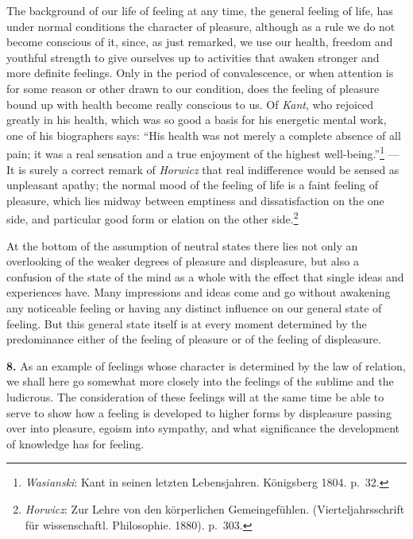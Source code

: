 \documentclass[12pt,a4paper]{book}
\newcommand{\opage}[1]{\marginnote{\footnotesize\textit{[#1]}}}
\begin{document}
The background of our life of feeling at any time, the general feeling
of life, has under normal conditions the character of pleasure, although
as a rule we do not become conscious of it, since, as just remarked, we
use our health, freedom and youthful strength to give ourselves up to
activities that awaken stronger and more definite feelings. Only in the
period of convalescence, or when attention is for some reason or other
drawn to our condition, does the feeling of pleasure bound up with
health become really conscious to us. Of \emph{Kant}, who rejoiced
greatly in his health, which was so good a basis for his energetic
mental work, one of his biographers says: ``His health was not merely a
complete absence of all pain; it was a real sensation and a true
enjoyment of the highest well-being.''\footnote{\emph{Wasianski}: Kant
in seinen letzten Lebensjahren. Königsberg 1804. p.~32.} --- It is
surely a correct remark of \emph{Horwicz} that real indifference would
be sensed as unpleasant apathy; the normal mood of the feeling of life
is a faint feeling of pleasure, which lies midway between emptiness and
dissatisfaction on the one side, and particular good form or elation on
the other
side.\footnote{\emph{Horwicz}: Zur Lehre von den körperlichen
Gemeingefühlen. (Vierteljahrsschrift für wissenschaftl. Philosophie.
1880). p.~303.}

\opage{341}At the bottom of the assumption of neutral states there lies
not only an overlooking of the weaker degrees of pleasure and
displeasure, but also a confusion of the state of the mind as a whole
with the effect that single ideas and experiences have. Many impressions
and ideas come and go without awakening any noticeable feeling or having
any distinct influence on our general state of feeling. But this general
state itself is at every moment determined by the predominance either of
the feeling of pleasure or of the feeling of displeasure.

\textbf{8.} As an example of feelings whose character is determined by
the law of relation, we shall here go somewhat more closely into the
feelings of the sublime and the ludicrous. The consideration of these
feelings will at the same time be able to serve to show how a feeling
is developed to higher forms by displeasure passing over into pleasure,
egoism into sympathy, and what significance the development of knowledge
has for feeling.
\end{document}
